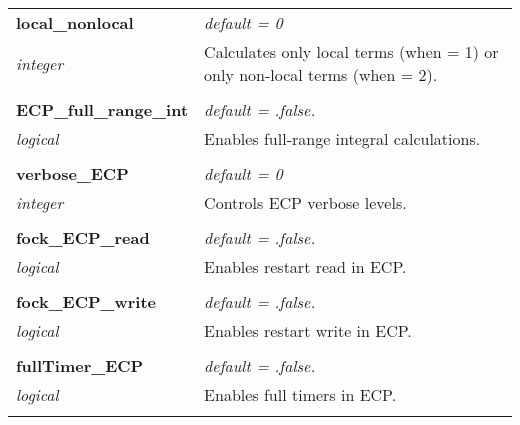 \begin{Spacing}{1.0}
\begin{longtable}{ p{} p{} }
   \textbf{local\_nonlocal}
   &  \textit{default = 0}
   \\*\textit{integer}
   & Calculates only local terms (when = 1) or
   only non-local terms (when = 2).\\* \\

   \textbf{ECP\_full\_range\_int}
   &  \textit{default = .false. }
   \\*\textit{logical}
   & Enables full-range integral calculations.\\* \\

   \textbf{verbose\_ECP}
   &  \textit{default = 0}
   \\*\textit{integer}
   & Controls ECP verbose levels.\\* \\

   \textbf{fock\_ECP\_read}
   &  \textit{default = .false. }
   \\*\textit{logical}
   & Enables restart read in ECP.\\* \\

   \textbf{fock\_ECP\_write}
   &  \textit{default = .false. }
   \\*\textit{logical}
   & Enables restart write in ECP.\\* \\

   \textbf{fullTimer\_ECP}
   &  \textit{default = .false. }
   \\*\textit{logical}
   & Enables full timers in ECP.\\* \\

\end{longtable}
\end{Spacing}
